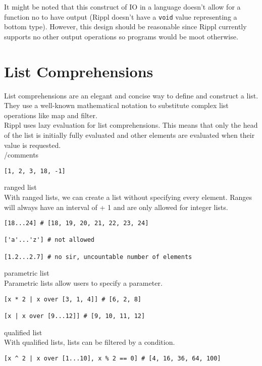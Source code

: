 ﻿\documentclass[5pt]{article}
\begin{document}
It might be noted that this construct of IO in a language doesn't allow for a function no to have output (Rippl doesn't have a \texttt{void} value representing a bottom type). However, this design should be reasonable since Rippl currently supports no other output operations so programs would be moot otherwise. \\

\section{List Comprehensions} 
List comprehensions are an elegant and concise way to define and construct a list. They use a well-known mathematical notation to substitute complex list operations like map and filter. \\

Rippl uses lazy evaluation for list comprehensions. This means that only the head of the list is initially fully evaluated and other elements are evaluated when their value is requested. \\
/comments

\begin{lstlisting}[language=rippl]
[1, 2, 3, 18, -1]
\end{lstlisting}


ranged list \\
With ranged lists, we can create a list without specifying every element. Ranges will always have an interval of + 1 and are only allowed for integer lists. 

\begin{lstlisting}[language=rippl]
[18...24] # [18, 19, 20, 21, 22, 23, 24]

['a'...'z'] # not allowed

[1.2...2.7] # no sir, uncountable number of elements
\end{lstlisting}

parametric list \\
Parametric lists allow users to specify a parameter.

\begin{lstlisting}[language=rippl]
[x * 2 | x over [3, 1, 4]] # [6, 2, 8] 

[x | x over [9...12]] # [9, 10, 11, 12]
\end{lstlisting}


qualified list \\
With qualified lists, lists can be filtered by a condition.

\begin{lstlisting}[language=rippl]
[x ^ 2 | x over [1...10], x % 2 == 0] # [4, 16, 36, 64, 100]
\end{lstlisting}
\end{document}
